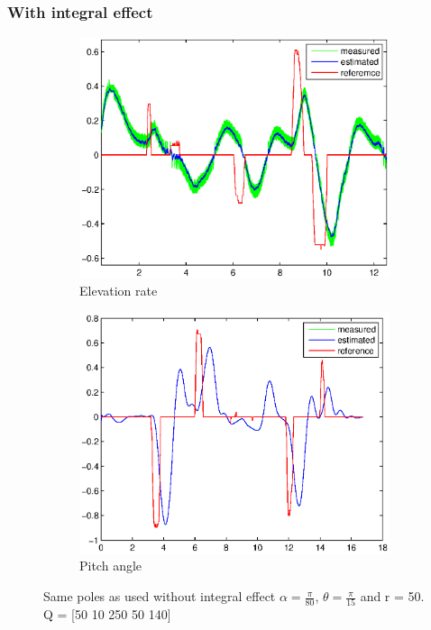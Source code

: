 \subsubsection{With integral effect}
\begin{figure}[H]
\graphicspath{ {Part4_pictures/}}
\begin{subfigure}{0.5\textwidth}
    \includegraphics[width=0.9\linewidth]{Part4_pictures/p4p2_int/p1_elevrate.eps} 
    \caption{Elevation rate}
    \label{fig:p4p2intP1e}
\end{subfigure}
\begin{subfigure}{0.5\textwidth}
    \includegraphics[width=0.9\linewidth]{Part4_pictures/p4p2_int/p1_pitch.eps}
    \caption{Pitch angle}
    \label{fig:p4p2intP1p}
\end{subfigure}
\caption{Same poles as used without integral effect $\alpha = \frac{\pi}{80}$, $\theta = \frac{\pi}{15}$ and r = 50. Q = [50 10 250 50 140]}
\label{p4p2intP1}
\end{figure}

